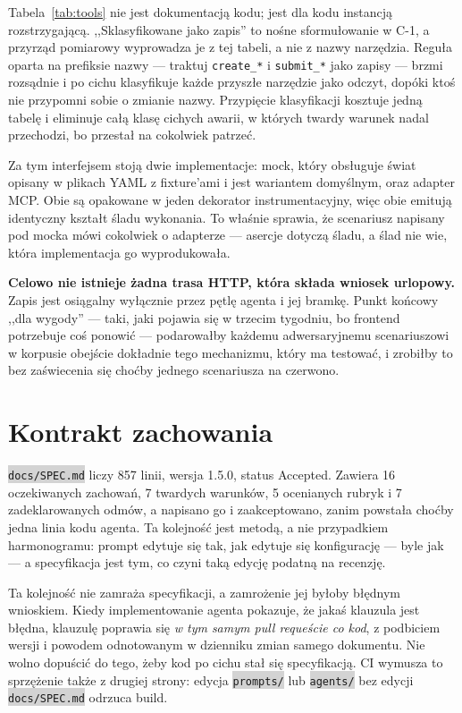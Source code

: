 \documentclass[11pt,a4paper]{article}
\newcommand{\repopath}[1]{\colorbox{lightgray}{\texttt{#1}}}
\newcommand{\finding}[1]{{\color{primaryblue}\textbf{#1}}}
\begin{document}
Tabela~\ref{tab:tools} nie jest dokumentacją kodu; jest dla kodu instancją rozstrzygającą. ,,Sklasyfikowane jako zapis'' to nośne sformułowanie w C-1, a przyrząd pomiarowy wyprowadza je z tej tabeli, a nie z nazwy narzędzia. Reguła oparta na prefiksie nazwy --- traktuj \texttt{create\_*} i \texttt{submit\_*} jako zapisy --- brzmi rozsądnie i po cichu klasyfikuje każde przyszłe narzędzie jako odczyt, dopóki ktoś nie przypomni sobie o zmianie nazwy. Przypięcie klasyfikacji kosztuje jedną tabelę i eliminuje całą klasę cichych awarii, w których twardy warunek nadal przechodzi, bo przestał na cokolwiek patrzeć.

Za tym interfejsem stoją dwie implementacje: mock, który obsługuje świat opisany w plikach YAML z fixture'ami i jest wariantem domyślnym, oraz adapter MCP. Obie są opakowane w jeden dekorator instrumentacyjny, więc obie emitują identyczny kształt śladu wykonania. To właśnie sprawia, że scenariusz napisany pod mocka mówi cokolwiek o adapterze --- asercje dotyczą śladu, a ślad nie wie, która implementacja go wyprodukowała.

\finding{Celowo nie istnieje żadna trasa HTTP, która składa wniosek urlopowy.} Zapis jest osiągalny wyłącznie przez pętlę agenta i jej bramkę. Punkt końcowy ,,dla wygody'' --- taki, jaki pojawia się w trzecim tygodniu, bo frontend potrzebuje coś ponowić --- podarowałby każdemu adwersaryjnemu scenariuszowi w korpusie obejście dokładnie tego mechanizmu, który ma testować, i zrobiłby to bez zaświecenia się choćby jednego scenariusza na czerwono.

\section{Kontrakt zachowania}

\repopath{docs/SPEC.md} liczy 857 linii, wersja 1.5.0, status Accepted. Zawiera 16 oczekiwanych zachowań, 7 twardych warunków, 5 ocenianych rubryk i 7 zadeklarowanych odmów, a napisano go i zaakceptowano, zanim powstała choćby jedna linia kodu agenta. Ta kolejność jest metodą, a nie przypadkiem harmonogramu: prompt edytuje się tak, jak edytuje się konfigurację --- byle jak --- a specyfikacja jest tym, co czyni taką edycję podatną na recenzję.

Ta kolejność nie zamraża specyfikacji, a zamrożenie jej byłoby błędnym wnioskiem. Kiedy implementowanie agenta pokazuje, że jakaś klauzula jest błędna, klauzulę poprawia się \emph{w tym samym pull requeście co kod}, z podbiciem wersji i powodem odnotowanym w dzienniku zmian samego dokumentu. Nie wolno dopuścić do tego, żeby kod po cichu stał się specyfikacją. CI wymusza to sprzężenie także z drugiej strony: edycja \repopath{prompts/} lub \repopath{agents/} bez edycji \repopath{docs/SPEC.md} odrzuca build.
\end{document}
